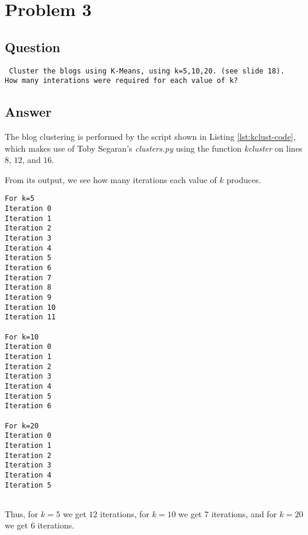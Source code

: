 \section{Problem 3}
\label{part3}
\subsection*{Question}
\begingroup
\begin{verbatim}
 Cluster the blogs using K-Means, using k=5,10,20. (see slide 18).
How many interations were required for each value of k?
\end{verbatim}
\subsection{Answer}

The blog clustering is performed by the script shown in Listing \ref{lst:kclust-code}, which makes use of Toby Segaran's \emph{clusters.py}  using the function \emph{kcluster} on lines $8$, $12$, and $16$.



From its output, we see how many iterations each value of $k$ produces.
\begin{lstlisting}[frame=single]
For k=5
Iteration 0
Iteration 1
Iteration 2
Iteration 3
Iteration 4
Iteration 5
Iteration 6
Iteration 7
Iteration 8
Iteration 9
Iteration 10
Iteration 11

For k=10
Iteration 0
Iteration 1
Iteration 2
Iteration 3
Iteration 4
Iteration 5
Iteration 6

For k=20
Iteration 0
Iteration 1
Iteration 2
Iteration 3
Iteration 4
Iteration 5


\end{lstlisting}

Thus, for $k=5$ we get $12$ iterations, for $k=10$ we get $7$ iterations, and for $k=20$ we get $6$ iterations.